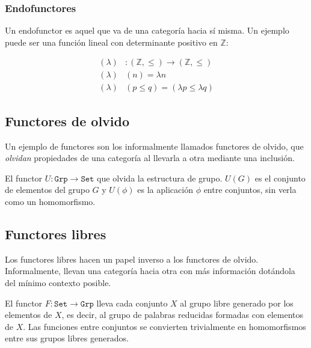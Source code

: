 \documentclass[11pt, fleqn, spanish]{book}
\begin{document}
\subsubsection{Endofunctores}
Un endofunctor es aquel que va de una categoría hacia sí misma. Un ejemplo
puede ser una función lineal con determinante positivo en $\mathbb{Z}$:

\begin{align*}
  (\lambda)&: \mathtt{(\mathbb{Z},\leq)} \rightarrow \mathtt{(\mathbb{Z},\leq)} \\
  (\lambda)&(n) = \lambda n \\
  (\lambda)&(p \leq q) = (\lambda p \leq \lambda q)
\end{align*}
  
\subsection {Functores de olvido}
Un ejemplo de functores son los informalmente llamados functores de
olvido, que \textit{olvidan} propiedades de una categoría al llevarla
a otra mediante una inclusión.

\begin{example}
  El functor $U: \mathtt{Grp} \rightarrow \mathtt{Set}$ que olvida la
  estructura de grupo. $U(G)$ es el conjunto de elementos del grupo
  $G$ y $U(\phi)$ es la aplicación $\phi$ entre conjuntos, sin verla
  como un homomorfismo.
\end{example}

\subsection {Functores libres}
Los functores libres hacen un papel inverso a los functores de olvido.
Informalmente, llevan una categoría hacia otra con más información
dotándola del mínimo contexto posible.

\begin{example}
  El functor $F: \mathtt{Set} \rightarrow \mathtt{Grp}$ lleva cada
  conjunto $X$ al grupo libre generado por los elementos de $X$, es
  decir, al grupo de palabras reducidas formadas con elementos de
  $X$. Las funciones entre conjuntos se convierten trivialmente en
  homomorfismos entre sus grupos libres generados.
\end{example}
\end{document}

